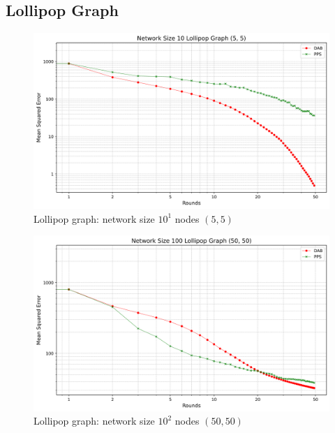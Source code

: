 \subsection{Lollipop Graph}
\begin{figure}[H]
    \centering
    \includegraphics[scale=0.5]{figures/lollipopGraphSimulations/DAB_vs_PPS_LG_r50_n10.png}
    \caption{Lollipop graph: network size $10^{1}$ nodes $(5, 5)$}
    \label{fig:50+50lollipopgraph}
\end{figure}
\begin{figure}[H]
    \centering
    \includegraphics[scale=0.5]{figures/lollipopGraphSimulations/DAB_vs_PPS_LG_r50_n100.png}
    \caption{Lollipop graph: network size $10^{2}$ nodes $(50, 50)$}
    \label{fig:50+50lollipopgraph}
\end{figure}
